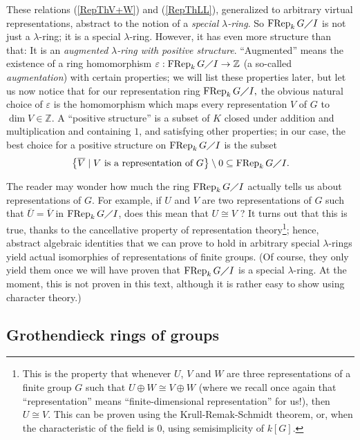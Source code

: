 \documentclass[numbers=enddot,12pt,final,onecolumn,notitlepage]{scrartcl}%
\begin{document}
These relations (\ref{RepThV+W}) and (\ref{RepThLL}), generalized to arbitrary
virtual representations, abstract to the notion of a \textit{special }%
$\lambda$\textit{-ring}. So$\ \operatorname*{FRep}_{k}G\diagup I$ is not just
a $\lambda$-ring; it is a special $\lambda$-ring. However, it has even more
structure than that: It is an \textit{augmented }$\lambda$\textit{-ring with
positive structure}. ``Augmented'' means the existence of a ring homomorphism
$\varepsilon:\operatorname*{FRep}_{k}G\diagup I\rightarrow\mathbb{Z}$ (a
so-called \textit{augmentation}) with certain properties; we will list these
properties later, but let us now notice that for our representation ring
$\operatorname*{FRep}_{k}G\diagup I,$ the obvious natural choice of
$\varepsilon$ is the homomorphism which maps every representation $V$ of $G$
to $\dim V\in\mathbb{Z}$. A ``positive structure'' is a subset of $K$ closed
under addition and multiplication and containing $1$, and satisfying other
properties; in our case, the best choice for a positive structure on
$\operatorname*{FRep}_{k}G\diagup I$ is the subset%
\[
\left\{  \overline{V}\mid V\text{ is a representation of }G\right\}
\setminus0\subseteq\operatorname*{FRep}\nolimits_{k}G\diagup I.
\]


The reader may wonder how much the ring $\operatorname*{FRep}_{k}G\diagup I$
actually tells us about representations of $G$. For example, if $U$ and $V$
are two representations of $G$ such that $\overline{U}=\overline{V}$ in
$\operatorname*{FRep}_{k}G\diagup I$, does this mean that $U\cong V$ ? It
turns out that this is true, thanks to the cancellative property of
representation theory\footnote{This is the property that whenever $U$, $V$ and
$W$ are three representations of a finite group $G$ such that $U\oplus W\cong
V\oplus W$ (where we recall once again that ``representation'' means
``finite-dimensional representation'' for us!), then $U\cong V$. This can be
proven using the Krull-Remak-Schmidt theorem, or, when the characteristic of
the field is $0$, using semisimplicity of $k\left[  G\right]  $.}; hence,
abstract algebraic identities that we can prove to hold in arbitrary special
$\lambda$-rings yield actual isomorphies of representations of finite groups.
(Of course, they only yield them once we will have proven that
$\operatorname*{FRep}_{k}G\diagup I$ is a special $\lambda$-ring. At the
moment, this is not proven in this text, although it is rather easy to show
using character theory.)

\subsection{Grothendieck rings of groups}
\end{document}
